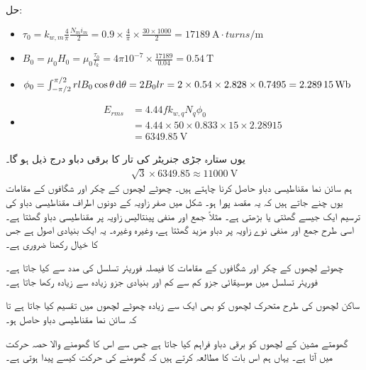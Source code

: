 حل:
\begin{itemize}
\item
\(
\tau_0=k_{w,m} \frac{4}{\pi}\frac{N_m i_m}{2}=0.9 \times \frac{4}{\pi} \times \frac{30 \times 1000}{2}=\SI{17189}{\ampere \cdot turns \per \meter}
\)
\item
\(
B_0=\mu_0 H_0=\mu_0 \frac{\tau_0}{l_k}=4 \pi 10^{-7} \times \frac{17189}{0.04}=\SI{0.54}{\tesla}
\)
\item
\(
\phi_0=\int_{-\pi/2}^{\pi/2}rl B_0\cos \theta \dif \theta=2 B_0 l r =2 \times 0.54 \times 2.828 \times 0.7495=\SI{2.28915}{\weber}
\)
\item
\begin{align*}
E_{rms}&=4.44 f k_{w,q} N_q \phi_0\\
&=4.44 \times 50 \times 0.833 \times 15 \times 2.28915\\
&=\SI{6349.85}{\volt} 
\end{align*}
\end{itemize}
یوں ستارہ جڑی جنریٹر کی تار کا برقی دباو درج ذیل ہو گا۔
\begin{align*}
\sqrt{3} \times 6349.85 \approx \SI{11000}{\volt}
\end{align*}
%
ہم  سائن نما مقناطیسی دباو حاصل کرنا چاہتے ہیں۔ چھوٹے لچھوں کے چکر اور شگافوں کے مقامات یوں چنے جاتے ہیں کہ یہ مقصد پورا ہو۔ شکل   میں  صفر زاویہ کے دونوں اطراف مقناطیسی دباو کی ترسیم ایک جیسے گھٹتی یا بڑھتی ہے۔ مثلاً جمع اور منفی  پینتالیس زاویہ پر مقناطیسی دباو    گھٹتا ہے۔ اسی طرح جمع اور منفی نوے زاویہ پر دباو مزید   گھٹتا ہے، وغیرہ وغیرہ۔ یہ ایک بنیادی اصول ہے جس کا خیال رکھنا ضروری ہے۔

چھوٹے لچھوں کے چکر اور شگافوں کے مقامات کا فیصلہ فوریئر تسلسل کی مدد سے کیا جاتا ہے۔فوریئر تسلسل میں موسیقائی جزو  کم سے کم اور بنیادی جزو  زیادہ سے زیادہ رکھا جاتا ہے۔

ساکن لچھوں کی طرح متحرک لچھوں کو بھی ایک سے زیادہ چھوٹے لچھوں میں تقسیم کیا جاتا ہے تا کہ سائن نما مقناطیسی دباو حاصل ہو۔

گھومتے مشین کے لچھوں کو برقی دباو فراہم کیا جاتا ہے جس سے اس کا گھومنے والا حصہ حرکت میں آتا ہے۔ یہاں ہم اس بات کا مطالعہ کرتے ہیں کہ گھومنے کی حرکت کیسے پیدا ہوتی ہے۔

